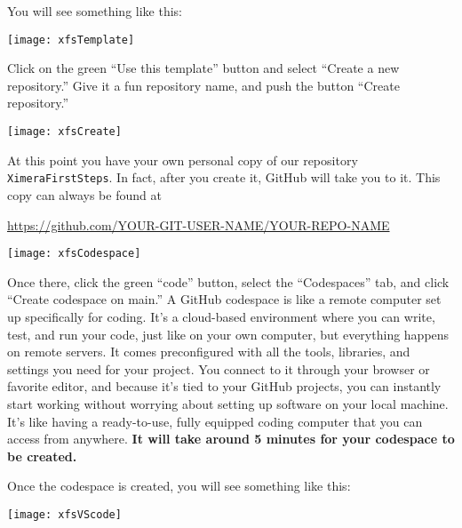 \documentclass{ximera}
\begin{document}
        You will see something like this:
        \pdfOnly{\end{multicols}}
\begin{image}
    \texttt{[image: xfsTemplate]}
\end{image}
\newpage
        Click on the green ``Use this template'' button and select ``Create a
        new repository.'' Give it a fun repository name, and push the button
        ``Create repository.'' 
\begin{image}
    \texttt{[image: xfsCreate]}
\end{image}
At this point you have your own personal copy of our repository \verb!XimeraFirstSteps!. 
In fact, after you create it, GitHub will take you to it. This copy can always be found at
\begin{center}
    \url{https://github.com/YOUR-GIT-USER-NAME/YOUR-REPO-NAME}
\end{center}
\newpage
\begin{image}
    \texttt{[image: xfsCodespace]}
\end{image}
    Once there, click the green ``code'' button, select
        the ``Codespaces'' tab, and click ``Create codespace on main.''
        A GitHub codespace is like a remote computer set up specifically for coding.
        It's a cloud-based environment where you can write, test, and run your code,
        just like on your own computer, but everything happens on remote servers. It
        comes preconfigured with all the tools, libraries, and settings you need for
        your project. You connect to it through your browser or favorite editor, and
        because it's tied to your GitHub projects, you can instantly start working
        without worrying about setting up software on your local machine. It's like
        having a ready-to-use, fully equipped coding computer that you can access from
        anywhere. \textbf{It will take around 5 minutes for your codespace to be
            created.}

\newpage

Once the codespace is created, you will see something like this:
\begin{image}
    \texttt{[image: xfsVScode]}
\end{image}
\end{document}
